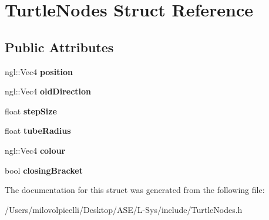 \hypertarget{struct_turtle_nodes}{}\section{Turtle\+Nodes Struct Reference}
\label{struct_turtle_nodes}
\subsection*{Public Attributes}
\begin{DoxyCompactItemize}
\item 
\mbox{\label{struct_turtle_nodes_aa53a9f654c9d9a606ca8144dcc79f122}} 
ngl\+::\+Vec4 {\bfseries position}
\item 
\mbox{\label{struct_turtle_nodes_aac1664c4d80eef6974b5972f609f25c2}} 
ngl\+::\+Vec4 {\bfseries old\+Direction}
\item 
\mbox{\label{struct_turtle_nodes_a65163073d8f24d533d613f96b0c89467}} 
float {\bfseries step\+Size}
\item 
\mbox{\label{struct_turtle_nodes_afd1ab0194246733268050119439570ee}} 
float {\bfseries tube\+Radius}
\item 
\mbox{\label{struct_turtle_nodes_a96137b1fc27c8d5fa693c9ef17afa2a9}} 
ngl\+::\+Vec4 {\bfseries colour}
\item 
\mbox{\label{struct_turtle_nodes_a1f57adb30061b2bc9def9ea7a66ce7f8}} 
bool {\bfseries closing\+Bracket}
\end{DoxyCompactItemize}


The documentation for this struct was generated from the following file\+:\begin{DoxyCompactItemize}
\item 
/\+Users/milovolpicelli/\+Desktop/\+A\+S\+E/\+L-\/\+Sys/include/Turtle\+Nodes.\+h\end{DoxyCompactItemize}
